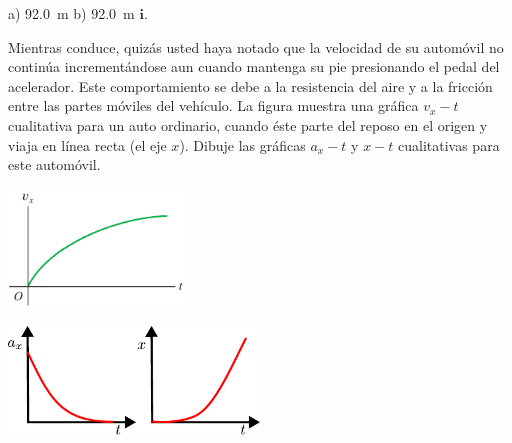 \documentclass[11pt]{article}
\begin{document}
\begin{solution}
    a) \qty{92.0}{m} b) \qty{92.0}{m} $\bm{i}$.
\end{solution}

\begin{exercise}
    \begin{multicols}{2}
Mientras conduce, quizás usted haya notado que la velocidad de su automóvil no continúa incrementándose aun cuando mantenga su pie presionando el pedal del acelerador. Este comportamiento se debe a la resistencia del aire y a la fricción entre las partes móviles del vehículo. La figura muestra una gráfica $v_x - t$ cualitativa para un auto ordinario, cuando éste parte del reposo en el origen y viaja en línea recta (el eje $x$). Dibuje las gráficas $a_x - t$ y $x - t$ cualitativas para este automóvil.
\begin{center}
    \includegraphics[width=0.35\textwidth]{figs/activ-06.png}
\end{center}
    \end{multicols}
\end{exercise}
\begin{solution}
\begin{center}
    \includegraphics[width=0.5\textwidth]{figs/ac-11.pdf}
\end{center}
\end{solution}
\end{document}
